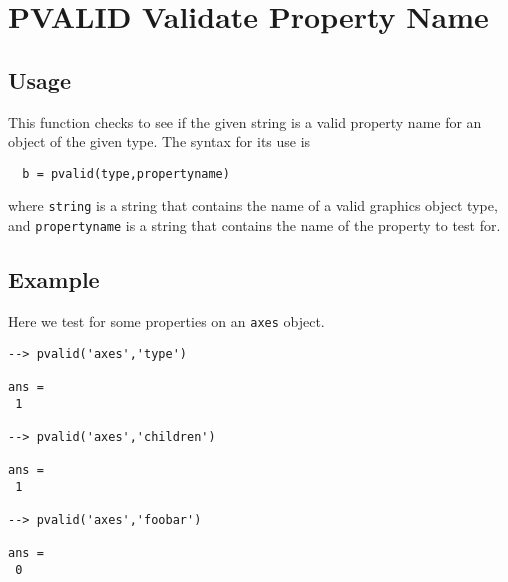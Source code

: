 \section{PVALID Validate Property Name}

\subsection{Usage}

This function checks to see if the given string is a valid
property name for an object of the given type.  The syntax
for its use is
\begin{verbatim}
  b = pvalid(type,propertyname)
\end{verbatim}
where \verb|string| is a string that contains the name of a 
 valid graphics object type, and
\verb|propertyname| is a string that contains the name of the
property to test for.
\subsection{Example}

Here we test for some properties on an \verb|axes| object.
\begin{verbatim}
--> pvalid('axes','type')

ans = 
 1 

--> pvalid('axes','children')

ans = 
 1 

--> pvalid('axes','foobar')

ans = 
 0 
\end{verbatim}
